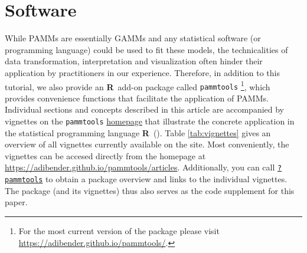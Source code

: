 \documentclass[submit]{smj}
\newcommand{\Rlang}{\textbf{\textsf{R}}}
\newcommand{\code}[1]{{\small \texttt{#1}}}
\begin{document}
\section{Software}\label{sec:software}
While PAMMs are essentially GAMMs and any statistical software (or programming
language) could be used to fit these models, the technicalities
of data transformation, interpretation and visualization often hinder their
application by practitioners in our experience. Therefore, in addition to this tutorial,
we also provide an \Rlang\ add-on package called \code{pammtools}
\citep{Ben:2017}\footnote{For the most current version of the package please visit
\url{https://adibender.github.io/pammtools/}.},
which provides convenience functions that facilitate the application of PAMMs.
Individual sections and concepts described in this article
are accompanied by vignettes on the \code{pammtools}
\href{https://adibender.github.io/pammtools/}{homepage} that illustrate
the concrete application in the statistical programming language
\Rlang~(\citealp{Team2016}).
Table \ref{tab:vignettes} gives an overview of all vignettes currently available
on the site. Most conveniently, the vignettes can be accesed directly
from the homepage at \url{https://adibender.github.io/pammtools/articles}.
Additionally, you can call
\href{https://adibender.github.io/pammtools/reference/pammtools.html}{\code{?pammtools}}
to obtain a package overview and links to the individual vignettes.
The package (and its vignettes) thus also serves as the code supplement for this
paper.
\end{document}

